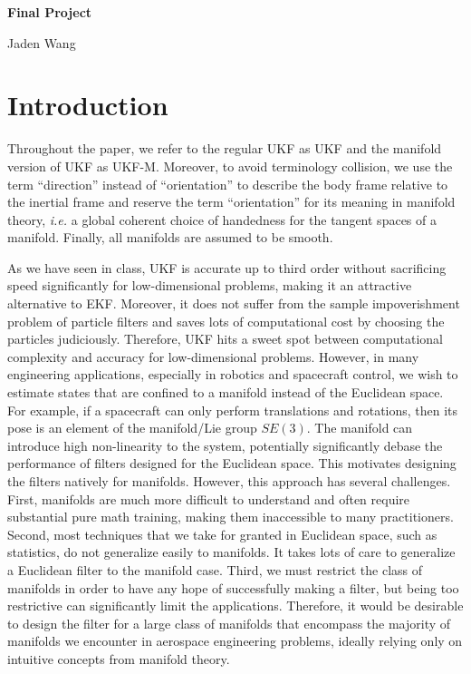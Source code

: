 \documentclass[12pt]{article}
\begin{document}
\centerline {\textsf{\textbf{\LARGE{Final Project}}}}
\centerline {Jaden Wang}
\vspace{.15in}
\section{Introduction}
Throughout the paper, we refer to the regular UKF as UKF and the manifold version of UKF as UKF-M. Moreover, to avoid terminology collision, we use the term ``direction'' instead of ``orientation'' to describe the body frame relative to the inertial frame and reserve the term ``orientation'' for its meaning in manifold theory, \emph{i.e.} a global coherent choice of handedness for the tangent spaces of a manifold. Finally, all manifolds are assumed to be smooth.

As we have seen in class, UKF is accurate up to third order without sacrificing speed significantly for low-dimensional problems, making it an attractive alternative to EKF. Moreover, it does not suffer from the sample impoverishment problem of particle filters and saves lots of computational cost by choosing the particles judiciously. Therefore, UKF hits a sweet spot between computational complexity and accuracy for low-dimensional problems. However, in many engineering applications, especially in robotics and spacecraft control, we wish to estimate states that are confined to a manifold instead of the Euclidean space. For example, if a spacecraft can only perform translations and rotations, then its pose is an element of the manifold/Lie group $ SE(3)$. The manifold can introduce high non-linearity to the system, potentially significantly debase the performance of filters designed for the Euclidean space. This motivates designing the filters natively for manifolds. However, this approach has several challenges. First, manifolds are much more difficult to understand and often require substantial pure math training, making them inaccessible to many practitioners. Second, most techniques that we take for granted in Euclidean space, such as statistics, do not generalize easily to manifolds. It takes lots of care to generalize a Euclidean filter to the manifold case. Third, we must restrict the class of manifolds in order to have any hope of successfully making a filter, but being too restrictive can significantly limit the applications. Therefore, it would be desirable to design the filter for a large class of manifolds that encompass the majority of manifolds we encounter in aerospace engineering problems, ideally relying only on intuitive concepts from manifold theory. 
\end{document}
